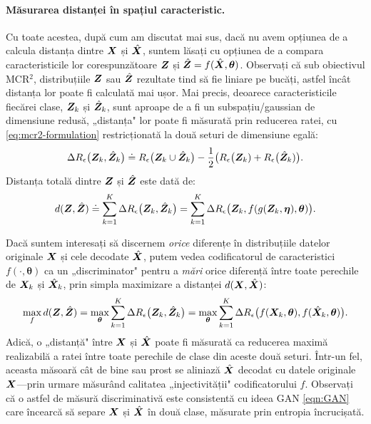 \documentclass[../../book-main_ro.tex]{subfiles}
\begin{document}
\paragraph{Măsurarea distanței în spațiul caracteristic.}
Cu toate acestea, după cum am discutat mai sus, dacă nu avem opțiunea de a calcula distanța dintre $\bm{X}$ și $\hat {\bm{X}}$, suntem lăsați cu opțiunea de a compara caracteristicile lor corespunzătoare $\bm{Z}$ și $\hat {\bm{Z}} = f(\hat {\bm{X}}, \bm \theta)$. Observați că sub obiectivul MCR$^2$, distribuțiile $\bm{Z}$ sau $\hat {\bm{Z}}$ rezultate tind să fie liniare pe bucăți, astfel încât distanța lor poate fi calculată mai ușor. Mai precis, deoarece caracteristicile fiecărei clase, $\bm{Z}_k$ și $\hat{\bm{Z}}_k$, sunt aproape de a fi un subspațiu/gaussian de dimensiune redusă, „distanța" lor poate fi măsurată prin reducerea ratei, cu \eqref{eq:mcr2-formulation} restricționată la două seturi de dimensiune egală:
\begin{equation}
\Delta R_\epsilon\big(\bm{Z}_k, \hat{\bm{Z}}_k\big) \doteq R_\epsilon\big(\bm{Z}_k \cup \hat{\bm{Z}}_k\big) - \frac{1}{2} \big( R_\epsilon\big(\bm{Z}_k) + R_\epsilon\big(\hat {\bm{Z}}_k)\big).
\end{equation}
Distanța totală dintre $\bm{Z}$ și $\hat {\bm{Z}}$ este dată de:
\begin{equation}
d(\bm{Z}, \hat {\bm{Z}}) \doteq   \sum_{k=1}^K \Delta R_\epsilon\big(\bm{Z}_k, \hat{\bm{Z}}_k\big) =  \sum_{k=1}^K \Delta R_\epsilon\big(\bm{Z}_k, f(g(\bm{Z}_k, \bm\eta),\bm \theta)\big).
\label{eqn:Z-distance}
\end{equation}


Dacă suntem interesați să discernem {\em orice} diferențe în distribuțiile datelor originale $\bm{X}$ și cele decodate $\hat {\bm{X}}$, putem vedea codificatorul de caracteristici $f(\cdot, \bm \theta)$ ca un „discriminator" pentru a {\em mări} orice diferență între toate perechile de $\bm{X}_k$ și $\hat {\bm{X}}_k$, prin simpla maximizare a distanței $d(\bm{X}, \hat {\bm{X}})$:
\begin{equation}
\max_f d(\bm{Z}, \hat {\bm{Z}}) = \max_{\bm \theta} \sum_{k=1}^K \Delta R_\epsilon\big(\bm{Z}_k, \hat{\bm{Z}}_k\big) = \max_{\bm \theta} \sum_{k=1}^K \Delta R_\epsilon\big(f(\bm{X}_k,\bm \theta), f(\hat{\bm{X}}_k,\bm \theta)\big).
    \label{eqn:max-distance}
\end{equation}
Adică, o „distanță" între $\bm{X}$ și $\hat {\bm{X}}$ poate fi măsurată ca reducerea maximă realizabilă a ratei între toate perechile de clase din aceste două seturi. Într-un fel, aceasta măsoară cât de bine sau prost se aliniază $\hat {\bm{X}}$ decodat cu datele originale $\bm{X}$---prin urmare măsurând calitatea „injectivității" codificatorului $f$. Observați că o astfel de măsură discriminativă este consistentă cu ideea GAN \eqref{eqn:GAN} care încearcă să separe $\bm{X}$ și $\hat {\bm{X}}$ în două clase, măsurate prin entropia încrucișată.
\end{document}
